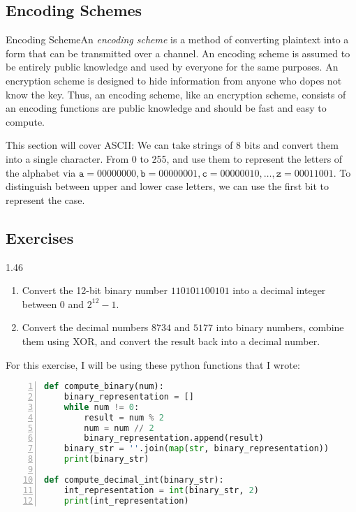 \subsection{Encoding Schemes}

\begin{definition}
    {Encoding Scheme}An \textit{encoding scheme} is a method of converting plaintext into a form that can be transmitted over a channel. An encoding scheme is assumed to be entirely public knowledge and used by everyone for the same purposes. An encryption scheme is designed to hide information from anyone who dopes not know the key. Thus, an encoding scheme, like an encryption scheme, consists of an encoding functions are public knowledge and should be fast and easy to compute.
\end{definition}

This section will cover ASCII\@: We can take strings of 8 bits and convert them into a single character. From 0 to 255, and use them to represent the letters of the alphabet via \(\texttt{a} = 00000000, \texttt{b} = 00000001, \texttt{c} = 00000010, \dots, \texttt{z} = 00011001\). To distinguish between upper and lower case letters, we can use the first bit to represent the case.

\renewcommand{\theenumi}{\alph{enumi}}
\renewcommand{\labelenumi}{(\theenumi)}
\subsection{Exercises}

\begin{exercise}
    {1.46}
    \begin{enumerate}
        \item Convert the 12-bit binary number \(110101100101\) into a decimal integer between \(0\) and \(2^{12} - 1\).
              \setcounter{enumi}{4}

        \item Convert the decimal numbers \(8734\) and \(5177\) into binary numbers, combine them using XOR, and convert the result back into a decimal number.
    \end{enumerate}
\end{exercise}

For this exercise, I will be using these python functions that I wrote:
\begin{lstlisting}[language=Python,numbers=left]
def compute_binary(num):
    binary_representation = []
    while num != 0:
        result = num % 2
        num = num // 2
        binary_representation.append(result)
    binary_str = ''.join(map(str, binary_representation))
    print(binary_str)

def compute_decimal_int(binary_str):
    int_representation = int(binary_str, 2)
    print(int_representation)
\end{lstlisting}

